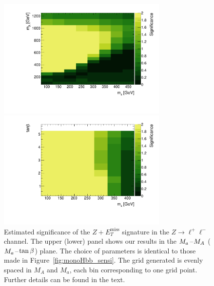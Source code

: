 \documentclass[a4paper, 11pt,notoc]{article}
\newcommand{\MET}{\ensuremath{E_T^\mathrm{miss}}\xspace}
\newcommand{\mA}{\ensuremath{M_{A}}\xspace}
\newcommand{\ma}{\ensuremath{M_{a}}\xspace}
\begin{document}
\begin{figure}[t!]
\centering
\includegraphics[width=0.75\textwidth]{mAma_Significance_wsyst_ll_2HDMa.pdf} 

\vspace{2mm}

\includegraphics[width=0.75\textwidth]{tanbma_Significance_wsyst_ll_2HDMa.pdf} 
\vspace{2mm}
\caption{Estimated significance of the $Z+\MET$ signature in the $Z \to \ell^+ \ell^-$ channel. The upper (lower) panel shows our results in the $\ma\hspace{0.25mm}$--$\hspace{0.25mm}\mA$ ($\ma\hspace{0.25mm}$--$\hspace{0.25mm}\tan \beta$) plane. The choice of parameters is identical to those made in Figure~\ref{fig:monoHbb_sensi}. The grid generated is evenly spaced in \mA and \ma, each bin corresponding to one grid point. Further details can be found in the text. }
\label{fig:monoZll_sensi}
\end{figure}
 
\end{document}
